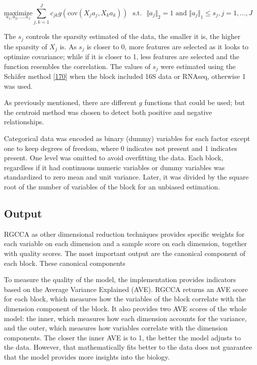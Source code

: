 \documentclass[
  a4paper,
]{book}
\begin{document}
\[
\underset{a_1,a_2, \dots,a_J}{\text{maximize}} \sum_{j, k = 1}^J c_{jk}g( \text{cov}(X_j a_j, X_k a_k)) \text{~~s.t.~~} \Vert a_j \Vert_2 = 1 \text{ and } \Vert a_j \Vert_1 \le s_j, j=1,\ldots,J
\]

The \(s_j\) controls the sparsity estimated of the data, the smaller it is, the higher the sparsity of \(X_j\) is.
As \(s_j\) is closer to 0, more features are selected as it looks to optimize covariance; while if it is closer to 1, less features are selected and the function resembles the correlation.
The values of \(s_j\) were estimated using the Schäfer method {[}\protect\hyperlink{ref-schuxe4fer2005}{170}{]} when the block included 16S data or RNAseq, otherwise 1 was used.

As previously mentioned, there are different \(g\) functions that could be used; but the centroid method was chosen to detect both positive and negative relationships.

Categorical data was encoded as binary (dummy) variables for each factor except one to keep degrees of freedom, where 0 indicates not present and 1 indicates present.
One level was omitted to avoid overfitting the data.
Each block, regardless if it had continuous numeric variables or dummy variables was standardized to zero mean and unit variance.
Later, it was divided by the square root of the number of variables of the block for an unbiased estimation.

\hypertarget{rgcca-output}{%
\subsection{Output}\label{rgcca-output}}

RGCCA as other dimensional reduction techniques provides specific weights for each variable on each dimension and a sample score on each dimension, together with quality scores.
The most important output are the canonical component of each block.
These canonical components

To measure the quality of the model, the implementation provides indicators based on the Average Variance Explained (AVE).
RGCCA returns an AVE score for each block, which measures how the variables of the block correlate with the dimension component of the block.
It also provides two AVE scores of the whole model: the inner, which measures how each dimension accounts for the variance, and the outer, which measures how variables correlate with the dimension components.
The closer the inner AVE is to 1, the better the model adjusts to the data.
However, that mathematically fits better to the data does not guarantee that the model provides more insights into the biology.
\end{document}
